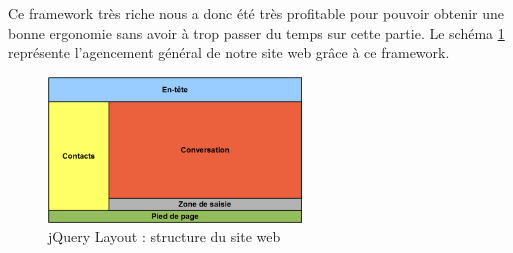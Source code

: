 Ce framework très riche nous a donc été très profitable pour pouvoir obtenir une bonne ergonomie sans avoir à trop passer du temps sur cette partie.
Le schéma \ref{siteWeb_jQueryLayout} représente l'agencement général de notre site web grâce à ce framework.

\begin{figure}[!h]
	\center
	\includegraphics[width=0.6\textwidth]{img/siteWeb_jQueryLayout.png}
	\caption{jQuery Layout : structure du site web}
	\label{siteWeb_jQueryLayout}
\end{figure}
